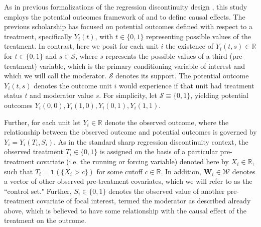 \documentclass[12pt]{article}
\makeatletter
\renewcommand{\section}{\@startsection{section}{1}{0mm}{-\baselineskip}{0.7\baselineskip}{\centering\normalfont\normalsize\bf}}
\makeatother
\begin{document}
\section{NOTATION AND SETUP}

As in previous formalizations of the regression discontinuity design \citep[e.g.][]{imbens2008regression}, this study employs the potential outcomes framework of \cite{neyman1923applications} and \cite{rubin1974estimating} to define causal effects. The previous scholarship has focused on potential outcomes defined with respect to a treatment, specifically $Y_i(t)$, with $t \in \{0,1\}$ representing possible values of the treatment. In contrast, here we posit for each unit $i$ the existence of $Y_i(t,s) \in \mathbb{R}$ for $t \in \{0,1\}$ and $s \in \mathcal{S}$, where $s$ represents the possible values of a third (pre-treatment) variable, which is the primary conditioning variable of interest and which we will call the moderator. $\mathcal{S}$ denotes its support. The potential outcome $Y_i(t,s)$ denotes the outcome unit $i$ would experience if that unit had treatment status $t$ and moderator value $s$. For simplicity, let $\mathcal{S} \equiv \{0,1\}$, yielding potential outcomes $Y_i(0,0) ,Y_i(1,0),Y_i(0,1),Y_i(1,1)$.

Further, for each unit let $Y_i \in \mathbb{R}$ denote the observed outcome, where the relationship between the observed outcome and potential outcomes is governed by $Y_i = Y_i(T_i, S_i)$. As in the standard sharp regression discontinuity context, the observed treatment $T_i \in \{ 0, 1\}$ is assigned on the basis of a particular pre-treatment covariate (i.e. the running or forcing variable) denoted here by $X_i \in \mathbb{R}$, such that $T_i = \bm{1}(\{ X_i > c \})$ for some cutoff $c \in \mathbb{R}$. In addition, $\bm{W}_i \in \bm{\mathcal{W}}$ denotes a vector of other observed pre-treatment covariates, which we will refer to as the ``control set." Further, $S_i \in \{ 0,1\}$ denotes the observed value of another pre-treatment covariate of focal interest, termed the moderator as described already above, which is believed to have some relationship with the causal effect of the treatment on the outcome.
\end{document}

